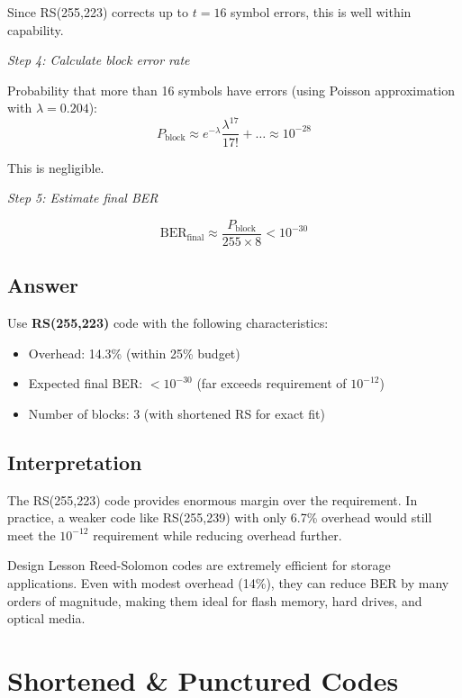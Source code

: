 Since RS(255,223) corrects up to $t = 16$ symbol errors, this is well within capability.

\textit{Step 4: Calculate block error rate}

Probability that more than 16 symbols have errors (using Poisson approximation with $\lambda = 0.204$):
\begin{equation}
P_{\text{block}} \approx e^{-\lambda} \frac{\lambda^{17}}{17!} + \ldots \approx 10^{-28}
\end{equation}

This is negligible.

\textit{Step 5: Estimate final BER}

\begin{equation}
\text{BER}_{\text{final}} \approx \frac{P_{\text{block}}}{255 \times 8} < 10^{-30}
\end{equation}

\subsection*{Answer}

Use \textbf{RS(255,223)} code with the following characteristics:
\begin{itemize}
\item Overhead: 14.3\% (within 25\% budget)
\item Expected final BER: $< 10^{-30}$ (far exceeds requirement of $10^{-12}$)
\item Number of blocks: 3 (with shortened RS for exact fit)
\end{itemize}

\subsection*{Interpretation}

The RS(255,223) code provides enormous margin over the requirement. In practice, a weaker code like RS(255,239) with only 6.7\% overhead would still meet the $10^{-12}$ requirement while reducing overhead further.

\begin{calloutbox}{Design Lesson}
Reed-Solomon codes are extremely efficient for storage applications. Even with modest overhead (14\%), they can reduce BER by many orders of magnitude, making them ideal for flash memory, hard drives, and optical media.
\end{calloutbox}

\section{Shortened \& Punctured Codes}\label{shortened-punctured-codes}

